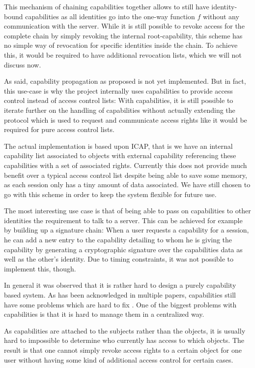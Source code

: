 This mechanism of chaining capabilities together allows to still have identity-bound capabilities as all identities go into the one-way function $f$ without any communication with the server.
While it is still possible to revoke access for the complete chain by simply revoking the internal root-capability, this scheme has no simple way of revocation for specific identities inside the chain.
To achieve this, it would be required to have additional revocation lists, which we will not discuss now.

As said, capability propagation as proposed is not yet implemented.
But in fact, this use-case is why the project internally uses capabilities to provide access control instead of access control lists:
With capabilities, it is still possible to iterate further on the handling of capabilities without actually extending the protocol which is used to request and communicate access rights like it would be required for pure access control lists.

\bigskip

The actual implementation is based upon ICAP, that is we have an internal capability list associated to objects with external capability referencing these capabilities with a set of associated rights.
Currently this does not provide much benefit over a typical access control list despite being able to save some memory, as each session only has a tiny amount of data associated.
We have still chosen to go with this scheme in order to keep the system flexible for future use.

The most interesting use case is that of being able to pass on capabilities to other identities the requirement to talk to a server.
This can be achieved for example by building up a signature chain:
When a user requests a capability for a session, he can add a new entry to the capability detailing to whom he is giving the capability by generating a cryptographic signature over the capabilities data as well as the other's identity.
Due to timing constraints, it was not possible to implement this, though.

\bigskip

In general it was observed that it is rather hard to design a purely capability based system.
As has been acknowledged in multiple papers, capabilities still have some problems which are hard to fix \cite{gong1989secure,shapiro1999eros}.
One of the biggest problems with capabilities is that it is hard to manage them in a centralized way.

As capabilities are attached to the subjects rather than the objects, it is usually hard to impossible to determine who currently has access to which objects.
The result is that one cannot simply revoke access rights to a certain object for one user without having some kind of additional access control for certain cases.

